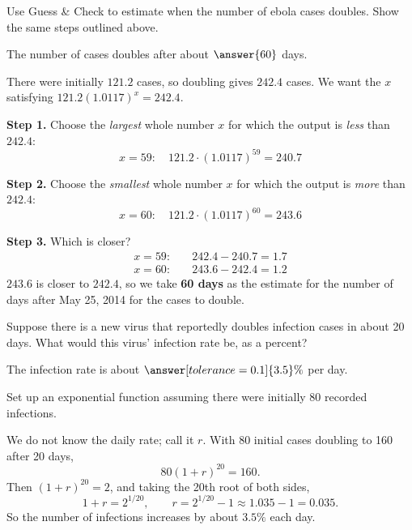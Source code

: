 \documentclass[12pt]{ximera}
\begin{document}
\begin{problem}
Use Guess \& Check to estimate when the number of ebola cases doubles. Show the same
steps outlined above.

The number of cases doubles after about $\answer{60}$ days.

\begin{hint}
There were initially $121.2$ cases, so doubling gives $242.4$ cases. We want the $x$
satisfying $121.2(1.0117)^{x} = 242.4$.
\end{hint}

\begin{solution}
\textbf{Step 1.} Choose the \emph{largest} whole number $x$ for which the output is
\emph{less} than $242.4$:
\[
x = 59: \quad 121.2 \cdot (1.0117)^{59} = 240.7
\]

\textbf{Step 2.} Choose the \emph{smallest} whole number $x$ for which the output is
\emph{more} than $242.4$:
\[
x = 60: \quad 121.2 \cdot (1.0117)^{60} = 243.6
\]

\textbf{Step 3.} Which is closer?
\[
\begin{aligned}
x = 59: \quad & 242.4 - 240.7 = 1.7 \\
x = 60: \quad & 243.6 - 242.4 = 1.2
\end{aligned}
\]
$243.6$ is closer to $242.4$, so we take \textbf{60 days} as the estimate for the
number of days after May 25, 2014 for the cases to double.
\end{solution}
\end{problem}

\begin{problem}
Suppose there is a new virus that reportedly doubles infection cases in about 20
days. What would this virus' infection rate be, as a percent?

The infection rate is about $\answer[tolerance=0.1]{3.5}\%$ per day.

\begin{hint}
Set up an exponential function assuming there were initially 80 recorded infections.
\end{hint}

\begin{solution}
We do not know the daily rate; call it $r$. With 80 initial cases doubling to 160
after 20 days,
\[
80(1+r)^{20} = 160.
\]
Then $(1+r)^{20} = 2$, and taking the 20th root of both sides,
\[
1 + r = 2^{1/20}, \qquad r = 2^{1/20} - 1 \approx 1.035 - 1 = 0.035.
\]
So the number of infections increases by about $3.5\%$ each day.
\end{solution}
\end{problem}
\end{document}
